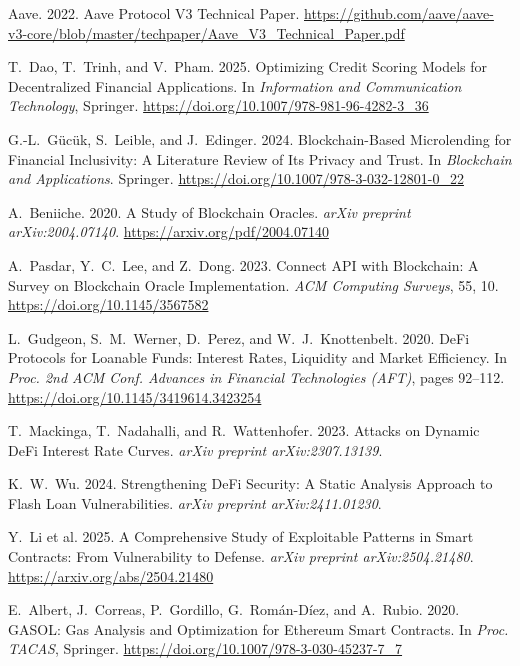 \documentclass[12pt,a4paper]{report}
\begin{document}
{\begin{enumerate}[label={[\arabic*]}]
\item Aave. 2022. Aave Protocol V3 Technical Paper. \url{https://github.com/aave/aave-v3-core/blob/master/techpaper/Aave_V3_Technical_Paper.pdf}

\item T.~Dao, T.~Trinh, and V.~Pham. 2025. Optimizing Credit Scoring Models for Decentralized Financial Applications. In \emph{Information and Communication Technology}, Springer. \url{https://doi.org/10.1007/978-981-96-4282-3_36}

\item G.-L.~G\"{u}c\"{u}k, S.~Leible, and J.~Edinger. 2024. Blockchain-Based Microlending for Financial Inclusivity: A Literature Review of Its Privacy and Trust. In \emph{Blockchain and Applications}. Springer. \url{https://doi.org/10.1007/978-3-032-12801-0_22}

\item A.~Beniiche. 2020. A Study of Blockchain Oracles. \emph{arXiv preprint arXiv:2004.07140}. \url{https://arxiv.org/pdf/2004.07140}

\item A.~Pasdar, Y.~C.~Lee, and Z.~Dong. 2023. Connect API with Blockchain: A Survey on Blockchain Oracle Implementation. \emph{ACM Computing Surveys}, 55, 10. \url{https://doi.org/10.1145/3567582}

\item L.~Gudgeon, S.~M.~Werner, D.~Perez, and W.~J.~Knottenbelt. 2020. DeFi Protocols for Loanable Funds: Interest Rates, Liquidity and Market Efficiency. In \emph{Proc. 2nd ACM Conf. Advances in Financial Technologies (AFT)}, pages 92--112. \url{https://doi.org/10.1145/3419614.3423254}

\item T.~Mackinga, T.~Nadahalli, and R.~Wattenhofer. 2023. Attacks on Dynamic DeFi Interest Rate Curves. \emph{arXiv preprint arXiv:2307.13139}.

\item K.~W.~Wu. 2024. Strengthening DeFi Security: A Static Analysis Approach to Flash Loan Vulnerabilities. \emph{arXiv preprint arXiv:2411.01230}.

\item Y.~Li et al. 2025. A Comprehensive Study of Exploitable Patterns in Smart Contracts: From Vulnerability to Defense. \emph{arXiv preprint arXiv:2504.21480}. \url{https://arxiv.org/abs/2504.21480}

\item E.~Albert, J.~Correas, P.~Gordillo, G.~Rom\'{a}n-D\'{i}ez, and A.~Rubio. 2020. GASOL: Gas Analysis and Optimization for Ethereum Smart Contracts. In \emph{Proc. TACAS}, Springer. \url{https://doi.org/10.1007/978-3-030-45237-7_7}


\end{enumerate}}
\end{document}
